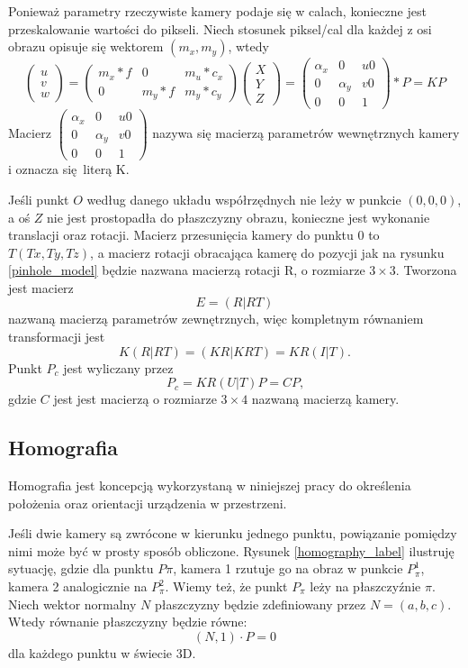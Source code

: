 \documentclass[12pt,twoside,polish]{article}
\begin{document}
Ponieważ parametry rzeczywiste kamery podaje się w calach, konieczne jest przeskalowanie wartości do pikseli. Niech stosunek piksel/cal dla każdej z osi obrazu opisuje się wektorem $(m_x, m_y)$, wtedy 
$$
\begin{pmatrix} u \\ v \\ w \end{pmatrix}
=
\begin{pmatrix} m_x*f & 0 & m_u*c_x \\ 0 & m_y*f & m_y*c_y \end{pmatrix}
\begin{pmatrix} X \\ Y \\ Z \end{pmatrix}
=
\begin{pmatrix} \alpha _x & 0 & u0 \\ 0 & \alpha _y & v0 \\ 0 & 0 & 1\end{pmatrix}
*P = KP
$$
Macierz $\begin{pmatrix} \alpha _x & 0 & u0 \\ 0 & \alpha _y & v0 \\ 0 & 0 & 1\end{pmatrix}$ nazywa się macierzą parametrów wewnętrznych kamery i oznacza się literą K.

Jeśli punkt $O$ według danego układu współrzędnych nie leży w punkcie $(0,0,0)$, a oś $Z$ nie jest prostopadła do płaszczyzny obrazu, konieczne jest wykonanie translacji oraz rotacji. Macierz przesunięcia kamery do punktu $0$ to $T(Tx, Ty, Tz)$, a macierz rotacji obracająca kamerę do pozycji jak na rysunku \ref{pinhole_model} będzie nazwana macierzą rotacji R, o rozmiarze $3 \times 3$. Tworzona jest macierz
$$
E = (R|RT)
$$
nazwaną macierzą parametrów zewnętrznych, więc kompletnym równaniem transformacji jest
$$ K(R|RT) = (KR|KRT) = KR(I|T)\text{.}$$
Punkt $P_c$ jest wyliczany przez
$$P_c = KR(U|T)P = CP\text{,}$$
gdzie $C$ jest jest macierzą o rozmiarze $3 \times 4$ nazwaną macierzą kamery.

\subsection{Homografia}
Homografia jest koncepcją wykorzystaną w niniejszej pracy do określenia położenia oraz orientacji urządzenia w przestrzeni.

Jeśli dwie kamery są zwrócone w kierunku jednego punktu, powiązanie pomiędzy nimi może być w prosty sposób obliczone. Rysunek \ref{homography_label} ilustruję sytuację, gdzie dla punktu $P\pi$, kamera 1 rzutuje go na obraz w punkcie $P^1_\pi$, kamera 2 analogicznie na $P^2_\pi$. Wiemy też, że punkt $P_\pi$ leży na płaszczyźnie $\pi$. Niech wektor normalny $N$ płaszczyzny będzie zdefiniowany przez $N = (a,b,c)$. Wtedy równanie płaszczyzny będzie równe:
$$ (N, 1) \cdot P = 0 $$
dla każdego punktu w świecie 3D.
\end{document}

